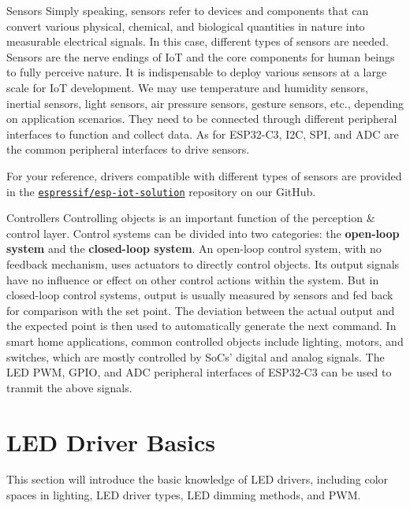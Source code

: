 \documentclass[a4paper,12pt]{book}
\begin{document}
\begin{term}{Sensors}
Simply speaking, sensors refer to devices and components that can convert various physical, chemical, and biological quantities in nature into measurable electrical signals. In this case, different types of sensors are needed. Sensors are the nerve endings of IoT and the core components for human beings to fully perceive nature. It is indispensable to deploy various sensors at a large scale for IoT development. We may use temperature and humidity sensors, inertial sensors, light sensors, air pressure sensors, gesture sensors, etc., depending on application scenarios. They need to be connected through different peripheral interfaces to function and collect data. As for ESP32-C3, I2C, SPI, and ADC are the common peripheral interfaces to drive sensors.

\vspace{6pt}
For your reference, drivers compatible with different types of sensors are provided in the \href{https://github.com/espressif/esp-iot-solution}{\texttt{espressif/esp-iot-solution}} repository on our GitHub.
\end{term}

\begin{term}{Controllers}
Controlling objects is an important function of the perception \& control layer. Control systems can be divided into two categories: the \textbf{open-loop system} and the \textbf{closed-loop system}. An open-loop control system, with no feedback mechanism, uses actuators to directly control objects. Its output signals have no influence or effect on other control actions within the system. But in closed-loop control systems, output is usually measured by sensors and fed back for comparison with the set point. The deviation between the actual output and the expected point is then used to automatically generate the next command. In smart home applications, common controlled objects include lighting, motors, and switches, which are mostly controlled by SoCs’ digital and analog signals. The LED PWM, GPIO, and ADC peripheral interfaces of ESP32-C3 can be used to tranmit the above signals.
\end{term}

\section{LED Driver Basics}
This section will introduce the basic knowledge of LED drivers, including color spaces in lighting, LED driver types, LED dimming methods, and PWM.
\end{document}
